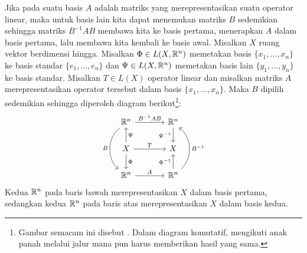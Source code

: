 Jika pada suatu basis $A$ adalah matriks yang merepresentasikan suatu
operator linear, maka untuk basis lain kita dapat menemukan matriks $B$ sedemikian
sehingga matriks $B^{-1}AB$ membawa kita ke basis pertama, menerapkan $A$ dalam
basis pertama, lalu membawa kita kembali ke basis awal.
Misalkan $X$ ruang vektor berdimensi hingga.
Misalkan $\Phi \in L(X,{\mathbb{R}}^n)$ memetakan basis $\{ x_1,\ldots,x_n \}$ ke
basis standar $\{ e_1,\ldots,e_n \}$ dan $\Psi \in L(X,{\mathbb{R}}^n)$
memetakan basis lain $\{ y_1, \ldots, y_n \}$ ke basis standar.
Misalkan $T \in L(X)$ operator linear dan misalkan matriks $A$
merepresentasikan operator tersebut
dalam basis $\{ x_1,\ldots,x_n \}$.
Maka $B$ dipilih sedemikian sehingga diperoleh diagram berikut\footnote{%
Gambar semacam ini disebut \emph{}.
Dalam diagram komutatif,
mengikuti anak panah melalui jalur mana pun harus memberikan hasil yang sama.}:
\begin{equation*}
\begin{tikzcd}[row sep=normal,column sep=large]
\R^n \ar[r, "B^{-1}AB"]  \ar[dd, bend right=50, "B"'] &
  \R^n \ar[d, "\Psi^{-1}"'] \\
X \ar[r, "T"] \ar[u, "\Psi"'] \ar[d, "\Phi"]        &
  X \\
\R^n \ar[r, "A"]                                      &
  \R^n \ar[u, "\Phi^{-1}"] \ar[uu, bend right=50, "B^{-1}"']
\end{tikzcd}
\end{equation*}
Kedua ${\mathbb{R}}^n$ pada baris bawah merepresentasikan
$X$ dalam basis pertama, sedangkan kedua ${\mathbb{R}}^n$ pada baris atas merepresentasikan $X$ dalam
basis
kedua.

